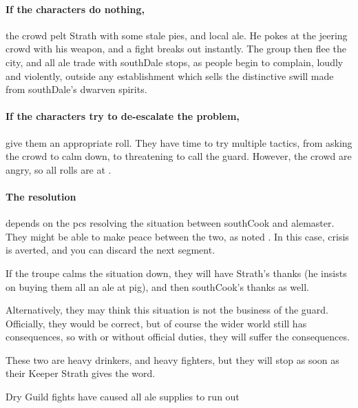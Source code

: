 \paragraph{If the characters do nothing,}
the crowd pelt Strath with some stale pies, and local ale.
He pokes at the jeering crowd with his weapon, and a fight breaks out instantly.
The group then flee the city, and all ale trade with \gls{southDale} stops, as people begin to complain, loudly and violently, outside any establishment which sells the distinctive swill made from \gls{southDale}'s dwarven spirits.

\paragraph{If the characters try to de-escalate the problem,}
give them an appropriate roll.
They have time to try multiple tactics, from asking the crowd to calm down, to threatening to call the guard.
However, the crowd are angry, so all rolls are at \tn[10].

\paragraph{The resolution}
depends on the \glspl{pc} resolving the situation between \gls{southCook} and \gls{alemaster}.
They might be able to make peace between the two, as noted .
In this case, crisis is averted, and you can discard the next \gls{segment}.

If the troupe calms the situation down, they will have Strath's thanks (he insists on buying them all an ale at \gls{pig}), and then \gls{southCook}'s thanks as well.

Alternatively, they may think this situation is not the business of the \gls{guard}.
Officially, they would be correct, but of course the wider world still has consequences, so with or without official duties, they will suffer the consequences.



These two are heavy drinkers, and heavy fighters, but they will stop as soon as their Keeper Strath gives the word.


\southCook

{\squash Dry}%
{Guild fights have caused all ale supplies to run out}%

